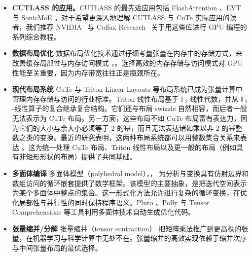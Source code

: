 \begin{itemize}
    \item {\bf CUTLASS 的应用。}CUTLASS 的最先进应用包括 FlashAttention \cite{dao2023flashattention2, shah2024flashattention3}、EVT \cite{chen2024evt} 与 SonicMoE \cite{sonic}。对于希望更深入地理解 CUTLASS 与 CuTe 实际应用的读者，我们推荐 NVIDIA~\cite{cecka2024cutlass, sun2025cutlass, thakkar2025cutlass} 与 Colfax Research~\cite{shah2024cutlass_streamk, shah2025cutlass_blackwell_tensor_memory, shah2025cutlass_blackwell_clusters, shah2025cutlass_blackwell_subbyte} 关于用这些库进行 GPU 编程的系列综合教程。
    \item {\bf 数据布局优化} 数据布局优化技术通过仔细考量张量在内存中的存储方式，来改善缓存局部性与内存访问模式 \cite{xu2023alt, bacon1994compiler, raman2007structure, ju1992reduction}，\cite{sharma2015data}。选择高效的内存存储与访问模式对 GPU 性能至关重要，因为内存带宽往往正是瓶颈所在。
    \item {\bf 现代布局系统} CuTe \cite{cutedocumentation, cutedsldocumentation, shah2024layout} 与 Triton Linear Layouts \cite{tritonlinearlayouts, zhou2026linear} 等布局系统已成为张量计算中管理内存存储与访问的行业标准。Triton 线性布局基于 $\mathbb{F}_2$-线性代数，并从 $\mathbb{F}_2$-线性算子的复合继承复合结构。它们还与布局 swizzle 自然相容，而后者一般无法表示为 CuTe 布局。另一方面，这些布局不如 CuTe 布局富有表达力，因为它们的大小与余大小必须等于 $2$ 的幂，而且无法表达诸如乘以非 $2$ 的幂整数之类的变换。最近的研究表明，这两种布局系统都可以用整数集合关系来表达 \cite{bhaskaracharya2025}。这为统一处理 CuTe 布局、Triton 线性布局以及更一般的布局（例如具有非矩形形状的布局）提供了共同基础。
    
    \item {\bf 多面体编译} 多面体模型（polyhedral model）\cite{verdoolaege2010isl}，\cite{verdoolaege2021presburger}，\cite{thangamani2024survey} 为分析与变换具有仿射边界和数组访问的循环嵌套提供了数学框架。该模型的主要抽象，是把迭代空间表示为某个多面体中整点的集合。这一形式化方法允许进行复杂的循环变换，在优化局部性与并行性的同时保持程序语义。Pluto \cite{bondhugula2008pluto}、Polly \cite{grosser2012polly} 与 Tensor Comprehensions \cite{vasilache2018tensor} 等工具利用多面体技术自动生成优化代码。
    \item {\bf 张量缩并/分解} 张量缩并（tensor contraction）\cite{ShiNiranjanAnandkumarCecka2016, zhao2022polyhedral, KoldaBader2009} 把矩阵乘法推广到更高秩的张量，在机器学习与科学计算中无处不在。张量缩并的高效实现依赖于缩并次序与中间张量布局的最优选择。  
\end{itemize}

